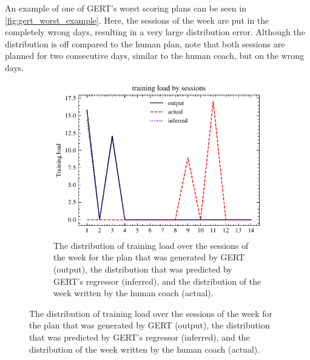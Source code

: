 An example of one of GERT's worst scoring plans can be seen in \cref{fig:gert_worst_example}.
Here, the sessions of the week are put in the completely wrong days, resulting in a very large distribution error.
Although the distribution is off compared to the human plan, note that both sessions are planned for two consecutive days, similar to the human coach, but on the wrong days.

\begin{figure}[ht]
    \centering
    \begin{subfigure}[t]{0.7\textwidth}
        \centering
        \includegraphics[width=\textwidth]{chapters/figures/result_examples/worst_dist.pdf}
        \captionsetup{width=.9\linewidth}
        \caption{The distribution of training load over the sessions of the week for the plan that was generated by GERT (output), the distribution that was predicted by GERT's regressor (inferred), and the distribution of the week written by the human coach (actual).}
    \end{subfigure}%


\end{figure}
